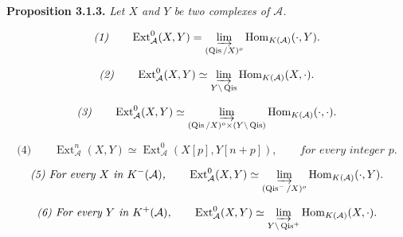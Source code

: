 \medskip\noindent\textbf{Proposition 3.1.3.}\quad
\textit{Let $X$ and $Y$ be two complexes of $\mathcal A$.}

\[
\textit{(1)}\qquad
\operatorname{Ext}_{\mathcal A}^{0}(X,Y)=
\varinjlim_{(\operatorname{Qis}/X)^o}
\operatorname{Hom}_{K(\mathcal A)}(\mathord\cdot,Y).
\]

\[
\textit{(2)}\qquad
\operatorname{Ext}_{\mathcal A}^{0}(X,Y)\simeq
\varinjlim_{Y\backslash\operatorname{Qis}}
\operatorname{Hom}_{K(\mathcal A)}(X,\mathord\cdot).
\]

\[
\textit{(3)}\qquad
\operatorname{Ext}_{\mathcal A}^{0}(X,Y)\simeq
\varinjlim_{(\operatorname{Qis}/X)^o\times
  (Y\backslash\operatorname{Qis})}
\operatorname{Hom}_{K(\mathcal A)}(\mathord\cdot,\mathord\cdot).
\]

\[
\textit{(4)}\qquad
\operatorname{Ext}_{\mathcal A}^{n}(X,Y)\simeq
\operatorname{Ext}_{\mathcal A}^{0}(X[p],Y[n+p]),
\qquad\textit{for every integer $p$.}
\]

\[
\textit{(5) For every $X$ in $K^{-}(\mathcal A)$,}\qquad
\operatorname{Ext}_{\mathcal A}^{0}(X,Y)\simeq
\varinjlim_{(\operatorname{Qis}^{-}/X)^o}
\operatorname{Hom}_{K(\mathcal A)}(\mathord\cdot,Y).
\]

\[
\textit{(6) For every $Y$ in $K^{+}(\mathcal A)$,}\qquad
\operatorname{Ext}_{\mathcal A}^{0}(X,Y)\simeq
\varinjlim_{Y\backslash\operatorname{Qis}^{+}}
\operatorname{Hom}_{K(\mathcal A)}(X,\mathord\cdot).
\]
\endgroup
